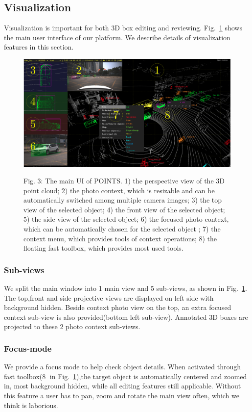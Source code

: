 \documentclass[letterpaper, 10 pt, conference]{ieeeconf}  %
\begin{document}
\subsection{Visualization}

Visualization is important for both 3D box editing and reviewing. Fig.~\ref{fig:main-ui} shows the main user interface of our platform. We describe details of visualization features in this section.

\begin{figure}[!t]
	\centering	
	\includegraphics[width=\linewidth]{./figures/main-ui}\\
	\caption{Fig. 3: The main UI of POINTS. 
		1) the perspective view of the 3D point cloud; 
		2) the photo context, which is resizable and can be automatically switched among multiple camera images; 
		3) the top view of the selected object;
		4) the front view of the selected object; 
		5) the side view of the selected object; 
		6) the focused photo context, which can be automatically chosen for the selected object ;
		7) the context menu, which provides tools of context operations; 
		8) the floating fast toolbox, which provides most used tools.}
	\label{fig:main-ui}
\end{figure}

\subsubsection{Sub-views}
\label{section:sub-views}
We split the main window into 1 main view and 5 sub-views, as shown in Fig.~\ref{fig:main-ui}. The top,front and side projective views are displayed on left side with background hidden. Beside context photo view on the top, an extra focused context sub-view is also provided(bottom left sub-view). Annotated 3D boxes are projected to these 2 photo context sub-views.

\subsubsection{Focus-mode}
We provide a focus mode to help check object details. When activated through fast toolbox(\textcircled{8} in Fig.~\ref{fig:main-ui}),the target object is automatically centered and zoomed in, most background hidden, while all editing features still applicable. Without this feature a user has to pan,  zoom and rotate the main view often, which we think is laborious.
\end{document}
